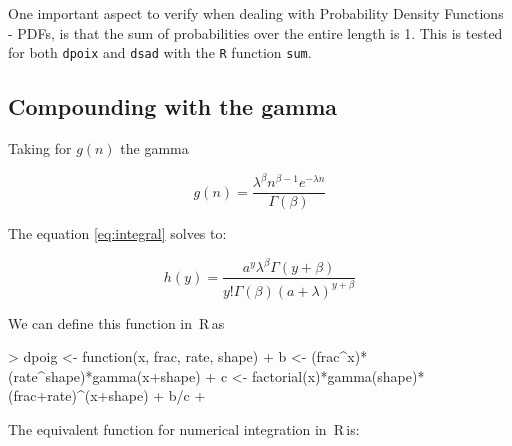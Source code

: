 \documentclass{article}
\newcommand{\R}{{\sf \,R\,}}
\newcommand{\code}[1]{\texttt{#1}}
\begin{document}
One important aspect to verify when dealing with Probability Density Functions - PDFs, is that the sum of probabilities over the entire length is 1. This is tested for both \code{dpoix} and \code{dsad} with the \code{R} function \code{sum}.



\subsection*{Compounding with the gamma}

 
Taking for $g(n)$ the gamma

\begin{equation}
\label{eq:gamma}
  g(n) = \frac{ \lambda^{\beta} n^{\beta-1} e^{- \lambda n} }{ \Gamma(\beta) }
\end{equation}

The equation \ref{eq:integral} solves to:

\begin{equation}
  \label{eq:poig}
  h(y) = \frac{a^y \lambda^\beta \Gamma(y+\beta)}{y!\Gamma(\beta)(a+\lambda)^{y+\beta}}
\end{equation}

We can define this function in \R as

\begin{Schunk}
\begin{Sinput}
> dpoig <- function(x, frac, rate, shape) {  
+   b <- (frac^x)*(rate^shape)*gamma(x+shape)
+   c <- factorial(x)*gamma(shape)*(frac+rate)^(x+shape)
+   b/c
+ }
\end{Sinput}
\end{Schunk}

The equivalent function for numerical integration in \R is:

\begin{Schunk}
\end{Schunk}
\end{document}
